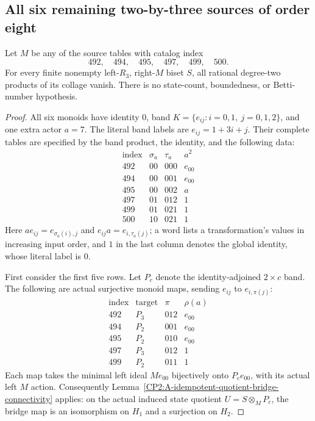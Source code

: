 \subsection{All six remaining two-by-three sources of order eight}

\begin{theorem}
\label{CP2:A-eight-two-by-three-all-sources}
Let $M$ be any of the source tables with catalog index
\[
 492,\quad494,\quad495,\quad497,\quad499,\quad500.
\]
For every finite nonempty left-$R_3$, right-$M$ biset $S$,
all rational degree-two products of its collage vanish.
There is no state-count, boundedness, or Betti-number hypothesis.
\end{theorem}
\begin{proof}
All six monoids have identity $0$, band
$K=\{e_{ij}:i=0,1,\ j=0,1,2\}$, and one extra actor $a=7$.
The literal band labels are $e_{ij}=1+3i+j$.
Their complete tables are specified by the band product,
the identity, and the following data:
\[
\begin{array}{c|c|c|c}
\text{index}&\sigma_a&\tau_a&a^2\\ \hline
492&00&000&e_{00}\\
494&00&001&e_{00}\\
495&00&002&a\\
497&01&012&1\\
499&01&021&1\\
500&10&021&1
\end{array}                                                   \tag{1}
\]
Here $ae_{ij}=e_{\sigma_a(i),j}$ and
$e_{ij}a=e_{i,\tau_a(j)}$; a word lists a transformation's
values in increasing input order, and $1$ in the last
column denotes the global identity, whose literal label is $0$.

First consider the first five rows.  Let $P_c$ denote
the identity-adjoined $2\times c$ band.  The following
are actual surjective monoid maps, sending
$e_{ij}$ to $e_{i,\pi(j)}$:
\[
\begin{array}{c|c|c|c}
\text{index}&\text{target}&\pi&\rho(a)\\ \hline
492&P_3&012&e_{00}\\
494&P_2&001&e_{00}\\
495&P_2&010&e_{00}\\
497&P_3&012&1\\
499&P_2&011&1
\end{array}                                                   \tag{2}
\]
Each map takes the minimal left ideal $Me_{00}$
bijectively onto $P_c e_{00}$, with its actual left
$M$ action.  Consequently
Lemma~\ref{CP2:A-idempotent-quotient-bridge-connectivity}
applies: on the actual induced state quotient
$U=S\otimes_M P_c$, the bridge map is an isomorphism
on $H_1$ and a surjection on $H_2$.


\end{proof}
